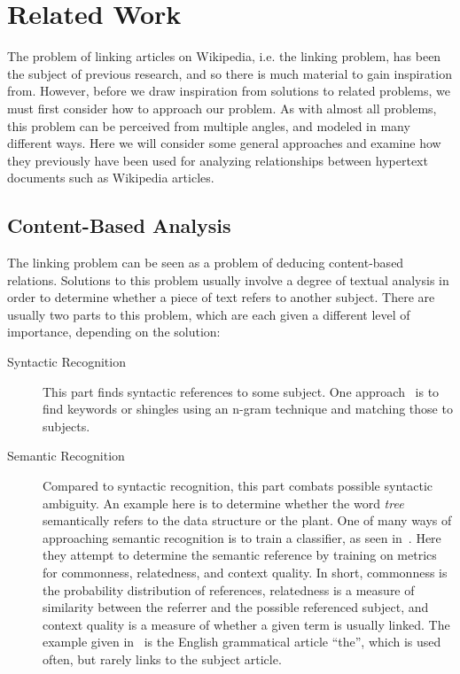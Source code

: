 \section{Related Work}\label{sec:related_work}
The problem of linking articles on Wikipedia, i.e. the linking problem, has been the subject of previous research, and so there is much material to gain inspiration from. However, before we draw inspiration from solutions to related problems, we must first consider how to approach our problem. As with almost all problems, this problem can be perceived from multiple angles, and modeled in many different ways. Here we will consider some general approaches and examine how they previously have been used for analyzing relationships between hypertext documents such as Wikipedia articles.

\subsection{Content-Based Analysis}\label{related_semantic_contextual}
The linking problem can be seen as a problem of deducing content-based relations. Solutions to this problem usually involve a degree of textual analysis in order to determine whether a piece of text refers to another subject. There are usually two parts to this problem, which are each given a different level of importance, depending on the solution:

\begin{description}
  \item[Syntactic Recognition] This part finds syntactic references to some subject. One approach~\cite{mihalcea2007wikify} is to find keywords or shingles using an n-gram technique and matching those to subjects.

  \item[Semantic Recognition] Compared to syntactic recognition, this part combats possible syntactic ambiguity. An example here is to determine whether the word \emph{tree} semantically refers to the data structure or the plant. One of many ways of approaching semantic recognition is to train a classifier, as seen in~\cite{milne2008learning}. Here they attempt to determine the semantic reference by training on metrics for commonness, relatedness, and context quality. In short, commonness is the probability distribution of references, relatedness is a measure of similarity between the referrer and the possible referenced subject, and context quality is a measure of whether a given term is usually linked. The example given in~\cite{milne2008learning} is the English grammatical article \enquote{the}, which is used often, but rarely links to the subject article.
\end{description}


